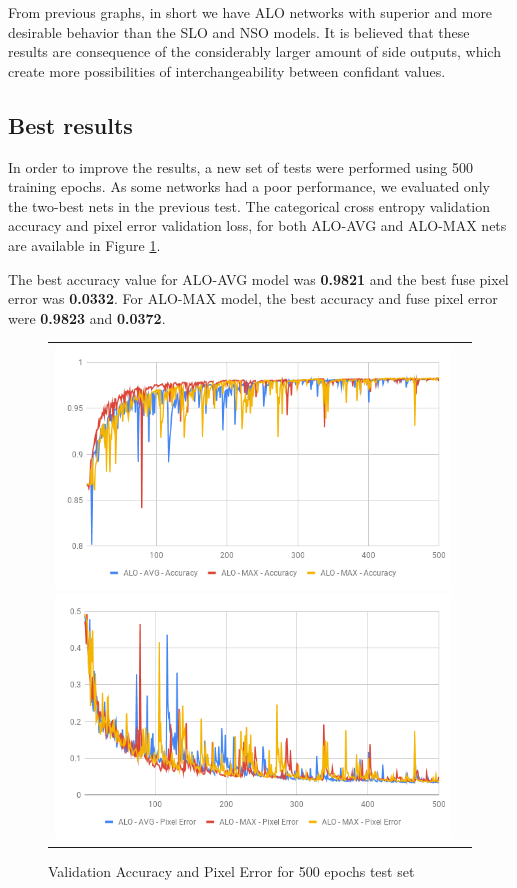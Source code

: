 From previous graphs, in short we have ALO networks with  superior and more desirable behavior than the SLO and NSO models. It is believed that these results are consequence of the considerably larger amount of side outputs, which create more possibilities of interchangeability between confidant values.

\subsection{Best results}

In order to improve the results, a new set of tests were performed using 500 training epochs. As some networks had a poor performance, we evaluated only the two-best nets in the previous test. The categorical cross entropy validation accuracy and pixel error validation loss, for both ALO-AVG and ALO-MAX nets are available in Figure \ref{fig:val_acc_500_epochs}.

The best accuracy value for ALO-AVG model was \textbf{0.9821} and the best fuse pixel error was \textbf{0.0332}. For ALO-MAX model, the best accuracy and fuse pixel error were \textbf{0.9823} and \textbf{0.0372}.

\begin{figure}
  \caption{Validation Accuracy and Pixel Error for 500 epochs test set}
  \centering
  \begin{tabular}{ll}
    \includegraphics[width=1.\columnwidth]{figures/falreis/val_acc_500_epochs.png}
  
    \includegraphics[width=1.\columnwidth]{figures/falreis/pixel_error_500_epochs.png}
  \end{tabular}%
  \label{fig:val_acc_500_epochs}
\end{figure}

